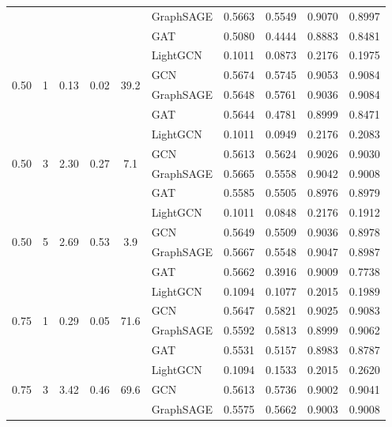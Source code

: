 {\begin{longtable}{cccccl rrrr}
 & & & & & GraphSAGE & 0.5663 & 0.5549 & 0.9070 & 0.8997 \\
 & & & & & GAT & 0.5080 & 0.4444 & 0.8883 & 0.8481 \\
\midrule
\multirow{4}{*}{0.50} & \multirow{4}{*}{1} & \multirow{4}{*}{0.13} & \multirow{4}{*}{0.02} & \multirow{4}{*}{39.2} & LightGCN & 0.1011 & 0.0873 & 0.2176 & 0.1975 \\
 & & & & & GCN & 0.5674 & 0.5745 & 0.9053 & 0.9084 \\
 & & & & & GraphSAGE & 0.5648 & 0.5761 & 0.9036 & 0.9084 \\
 & & & & & GAT & 0.5644 & 0.4781 & 0.8999 & 0.8471 \\
\midrule
\multirow{4}{*}{0.50} & \multirow{4}{*}{3} & \multirow{4}{*}{2.30} & \multirow{4}{*}{0.27} & \multirow{4}{*}{7.1} & LightGCN & 0.1011 & 0.0949 & 0.2176 & 0.2083 \\
 & & & & & GCN & 0.5613 & 0.5624 & 0.9026 & 0.9030 \\
 & & & & & GraphSAGE & 0.5665 & 0.5558 & 0.9042 & 0.9008 \\
 & & & & & GAT & 0.5585 & 0.5505 & 0.8976 & 0.8979 \\
\midrule
\multirow{4}{*}{0.50} & \multirow{4}{*}{5} & \multirow{4}{*}{2.69} & \multirow{4}{*}{0.53} & \multirow{4}{*}{3.9} & LightGCN & 0.1011 & 0.0848 & 0.2176 & 0.1912 \\
 & & & & & GCN & 0.5649 & 0.5509 & 0.9036 & 0.8978 \\
 & & & & & GraphSAGE & 0.5667 & 0.5548 & 0.9047 & 0.8987 \\
 & & & & & GAT & 0.5662 & 0.3916 & 0.9009 & 0.7738 \\
\midrule
\multirow{4}{*}{0.75} & \multirow{4}{*}{1} & \multirow{4}{*}{0.29} & \multirow{4}{*}{0.05} & \multirow{4}{*}{71.6} & LightGCN & 0.1094 & 0.1077 & 0.2015 & 0.1989 \\
 & & & & & GCN & 0.5647 & 0.5821 & 0.9025 & 0.9083 \\
 & & & & & GraphSAGE & 0.5592 & 0.5813 & 0.8999 & 0.9062 \\
 & & & & & GAT & 0.5531 & 0.5157 & 0.8983 & 0.8787 \\
\midrule
\multirow{4}{*}{0.75} & \multirow{4}{*}{3} & \multirow{4}{*}{3.42} & \multirow{4}{*}{0.46} & \multirow{4}{*}{69.6} & LightGCN & 0.1094 & 0.1533 & 0.2015 & 0.2620 \\
 & & & & & GCN & 0.5613 & 0.5736 & 0.9002 & 0.9041 \\
 & & & & & GraphSAGE & 0.5575 & 0.5662 & 0.9003 & 0.9008 \\

\end{longtable}}
